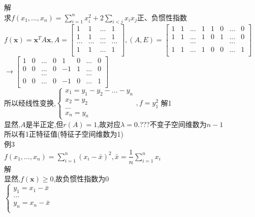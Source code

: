 \documentclass[11pt, a4paper, UTF8]{ctexart}
\begin{document}
解\\
求$f(x_1,...,x_n)=\sum_{i=1}^nx_i^2+2\sum_{i<j}x_ix_j$正、负惯性指数\\
$f(\bm x)=\bm x^TA\bm x,A=\begin{bmatrix}
1&1&...&1\\
1&1&...&1\\
...&...&...&...\\
1&1&...&1\\
\end{bmatrix},(A,E)=\begin{bmatrix}
1&1&...&1&1&0&...&0\\
1&1&...&1&0&1&...&0\\
&&...&&&&...&\\
1&1&...&1&0&0&...&1\\
\end{bmatrix}$\\
$\to \begin{bmatrix}
1&0&...&0&1&0&...&0\\
0&0&...&0&-1&1&...&0\\
&&...&&&&...&\\
0&0&...&0&-1&0&...&1\\
\end{bmatrix}$\\
所以经线性变换,$\begin{cases}
x_1=y_1-y_2-...-y_n\\
x_2=y_2\\
...\\
x_n=y_n
\end{cases},f=y_1^2$
解1\\
显然,$A$是半正定,但$r(A)=1$,故对应$\lambda=0$.???不变子空间维数为$n-1$\\
所以有1正特征值(特征子空间维数为1)\\
例3\\
$f(x_1,...,x_n)=\sum_{i=1}^n(x_i-\bar{x})^2,\bar{x}=\dfrac{1}{n}\sum_{i=1}^nx_i$\\
解\\
显然,$f(\bm x)\ge0$,故负惯性指数为0\\
$\begin{cases}
y_1=x_1-\bar{x}\\
...\\
y_n=x_n-\bar{x}\\
\end{cases}$
\section{}
\subsection{}
\end{document}
